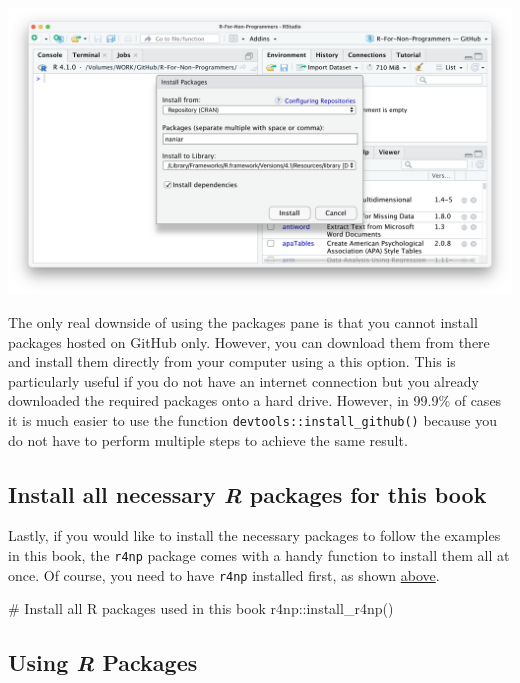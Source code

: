 \documentclass[
  letterpaper,
]{krantz}
\makeatletter
\newenvironment{Shaded}{\begin{snugshade}}{\end{snugshade}}
\newcommand{\CommentTok}[1]{\textcolor[rgb]{0.37,0.37,0.37}{#1}}
\newcommand{\FunctionTok}[1]{\textcolor[rgb]{0.28,0.35,0.67}{#1}}
\newcommand{\NormalTok}[1]{\textcolor[rgb]{0.00,0.23,0.31}{#1}}
\newcommand{\SpecialCharTok}[1]{\textcolor[rgb]{0.37,0.37,0.37}{#1}}
\newenvironment{kframe}{%
\medskip{}
\setlength{\fboxsep}{.8em}
 \def\at@end@of@kframe{}%
 \ifinner\ifhmode%
  \def\at@end@of@kframe{\end{minipage}}%
  \begin{minipage}{\columnwidth}%
 \fi\fi%
 \def\FrameCommand##1{\hskip\@totalleftmargin \hskip-\fboxsep
 \colorbox{shadecolor}{##1}\hskip-\fboxsep
     \hskip-\linewidth \hskip-\@totalleftmargin \hskip\columnwidth}%
 \MakeFramed {\advance\hsize-\width
   \@totalleftmargin\z@ \linewidth\hsize
   \@setminipage}}%
 {\par\unskip\endMakeFramed%
 \at@end@of@kframe}
\renewenvironment{Shaded}{\begin{kframe}}{\end{kframe}}
\makeatother
\begin{document}
\begin{enumerate}
  \includegraphics{images/chapter_05_img/install_r_packages/03_install_r_packages.png}
\end{enumerate}

The only real downside of using the packages pane is that you cannot
install packages hosted on GitHub only. However, you can download them
from there and install them directly from your computer using a this
option. This is particularly useful if you do not have an internet
connection but you already downloaded the required packages onto a hard
drive. However, in 99.9\% of cases it is much easier to use the function
\texttt{devtools::install\_github()} because you do not have to perform
multiple steps to achieve the same result.

\subsection{\texorpdfstring{Install all necessary \emph{R} packages for
this
book}{Install all necessary R packages for this book}}\label{sec-install-all-r-packages}

Lastly, if you would like to install the necessary packages to follow
the examples in this book, the \texttt{r4np} package comes with a handy
function to install them all at once. Of course, you need to have
\texttt{r4np} installed first, as shown \hyperref[install-r4np]{above}.

\begin{Shaded}
\begin{Highlighting}[]
\CommentTok{\# Install all R packages used in this book}
\NormalTok{r4np}\SpecialCharTok{::}\FunctionTok{install\_r4np}\NormalTok{()}
\end{Highlighting}
\end{Shaded}

\subsection{\texorpdfstring{Using \emph{R}
Packages}{Using R Packages}}\label{sec-using-r-packages}
\end{document}

